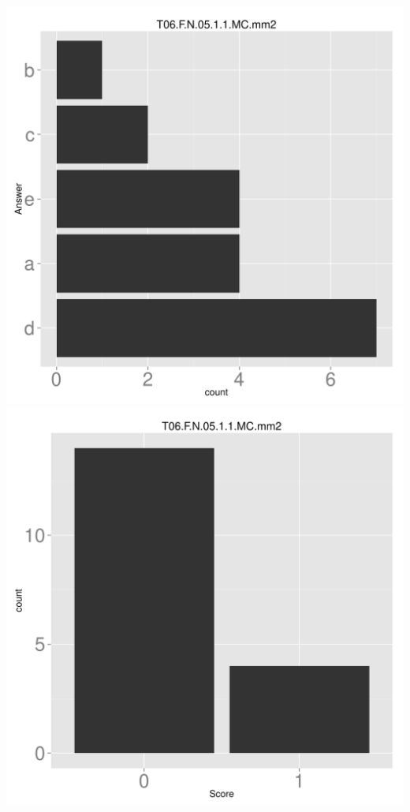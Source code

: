 \documentclass[12pt,nohyper]{tufte-handout}\usepackage[]{graphicx}\usepackage[]{color}
\begin{document}
\begin{center} \includegraphics[width=.45\linewidth]{Topic06_50_answer} \includegraphics[width=.45\linewidth]{Topic06_50_score} \end{center} 
\end{document}
